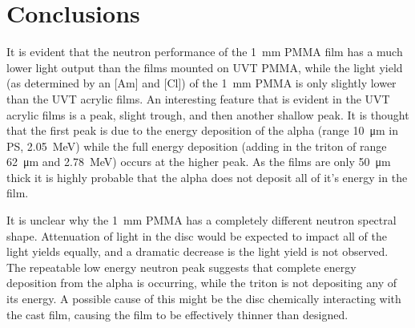 \documentclass[draftcls,onecolumn]{IEEEtran}
\begin{document}
\section{Conclusions}
It is evident that the neutron performance of the \SI{1}{\mm} PMMA film has a much lower light output than the films mounted on UVT PMMA, while the light yield (as determined by an [Am] and [Cl]) of the \SI{1}{\mm} PMMA is only slightly lower than the UVT acrylic films.
An interesting feature that is evident in the UVT acrylic films is a peak, slight trough, and then another shallow peak.
It is thought that the first peak is due to the energy deposition of the alpha (range \SI{10}{\um} in PS, \SI{2.05}{\MeV}) while the full energy deposition (adding in the triton of range \SI{62}{\um} and \SI{2.78}{\MeV}) occurs at the higher peak.
As the films are only \SI{50}{\um} thick it is highly probable that the alpha does not deposit all of it's energy in the film.

It is unclear why the \SI{1}{\mm} PMMA has a completely different neutron spectral shape.
Attenuation of light in the disc would be expected to impact all of the light yields equally, and a dramatic decrease is the light yield is not observed.
The repeatable low energy neutron peak suggests that complete energy deposition from the alpha is occurring, while the triton is not depositing any of its energy.
A possible cause of this might be the disc chemically interacting with the cast film, causing the film to be effectively thinner than designed.
\end{document}
